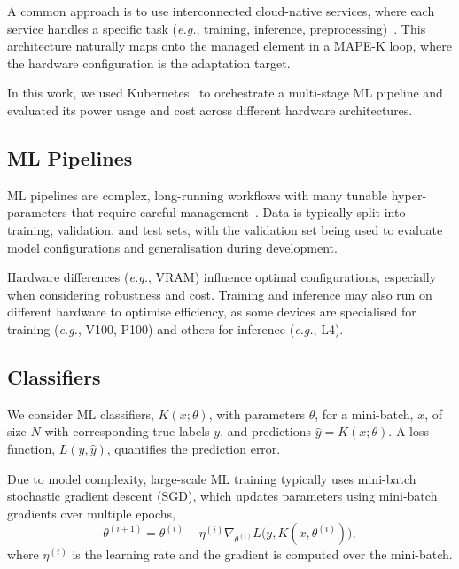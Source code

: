 \documentclass[conference]{IEEEtran}%
\begin{document}
A common approach is to use interconnected cloud-native services, where each service handles a specific task (\textit{e.g.}, training, inference, preprocessing)~\cite{panchal2024reusable,hasselbring2017microservice,zhou2022online,singh2023load}. 
This architecture naturally maps onto the managed element in a MAPE-K loop, where the hardware configuration is the adaptation target.

In this work, we used Kubernetes~\cite{k8s} to orchestrate a multi-stage ML pipeline and evaluated its power usage and cost across different hardware architectures.

\subsection{ML Pipelines}
\label{ml_pipelines}

ML pipelines are complex, long-running workflows with many tunable hyper-parameters that require careful management~\cite{dvc,hydra,k8s}. Data is typically split into training, validation, and test sets, with the validation set being used to evaluate model configurations and generalisation during development.

Hardware differences (\textit{e.g.}, VRAM) influence optimal configurations, especially when considering robustness and cost. Training and inference may also run on different hardware to optimise efficiency, as some devices are specialised for training (\textit{e.g.}, V100, P100) and others for inference (\textit{e.g.}, L4).

\subsection{Classifiers}

We consider ML classifiers, $K(x;\theta)$, with parameters $\theta$, for a mini-batch, $x$, of size $N$ with corresponding true labels $y$, and predictions $\hat{y} = K(x;\theta)$. 
A loss function, $L(y,\hat{y})$, quantifies the prediction error.

Due to model complexity, large-scale ML training typically uses mini-batch stochastic gradient descent (SGD), which updates parameters using mini-batch gradients over multiple epochs,
\begin{equation}
    \theta^{(i+1)} = \theta^{(i)} - \eta^{(i)} \nabla_{\theta^{(i)}} L\big(y, K(x, \theta^{(i)})\big),
\end{equation}
where $\eta^{(i)}$ is the learning rate and the gradient is computed over the mini-batch.
\end{document}
